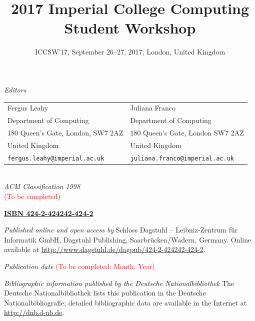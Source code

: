 \documentclass[a4paper,UKenglish]{oasicsmaster-v2016}
\title{\huge 2017 Imperial College Computing Student Workshop}
\subtitle{ICCSW'17, September 26--27, 2017, London, United Kingdom}
\newcommand{\VolumeISBN}{424-2-424242-424-2}
\begin{document}
\frontmatter


\maketitle


\begin{publicationinfo}%
\sffamily

\emph{Editors} \\[0.2cm]
\begin{tabular}{ll}
Fergus Leahy              &   Juliana Franco   \\
Department of Computing                  & Department of Computing \\
180 Queen's Gate, London, SW7 2AZ        & 180 Queen's Gate, London SW7 2AZ \\
United Kingdom                           & United Kingdom \\
\texttt{fergus.leahy@imperial.ac.uk} &  \texttt{juliana.franco@imperial.ac.uk}
\end{tabular}
\ \\

\bigskip
\bigskip
\bigskip
\bigskip
\emph{ACM Classification 1998}\\
\textcolor{red}{(To be completed)}

\bigskip
\bigskip

{\Large\bf\sffamily \href{http://www.dagstuhl.de/dagpub/\VolumeISBN}{ISBN \VolumeISBN}}

\bigskip
\bigskip

\emph{Published online and open access by}\newline
Schloss Dagstuhl -- Leibniz-Zentrum f\"ur Informatik GmbH, Dagstuhl Publishing, Saarbr\"ucken/Wadern, Germany. Online available at \href{http://www.dagstuhl.de/dagpub/\VolumeISBN}{http://www.dagstuhl.de/dagpub/\VolumeISBN}.

\bigskip
\emph{Publication date}\newline
\textcolor{red}{(To be completed: Month, Year)}

\bigskip
\bigskip

\emph{Bibliographic information published by the Deutsche Nationalbibliothek}\newline
The Deutsche Nationalbibliothek lists this publication in the Deutsche Nationalbibliografie; detailed bibliographic data are available in the Internet at \href{http://dnb.d-nb.de}{http://dnb.d-nb.de}. 


\end{publicationinfo}
\end{document}
